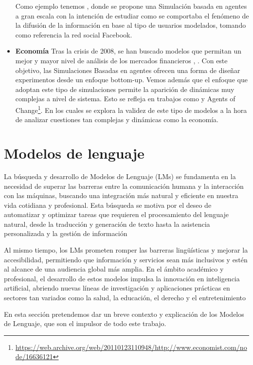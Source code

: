 \begin{itemize}
Como ejemplo tenemos \cite{nasrinpour2016agent}, donde se propone una Simulación  basada en agentes a gran escala con la intención de estudiar como se comportaba el fenómeno de la difusión de la información en base al tipo de usuarios modelados, tomando como referencia la red social Facebook.
	\item \textbf{Economía} Tras la crisis de 2008, se han buscado modelos que permitan un mejor y mayor nivel de análisis de los mercados financieros \cite {bookstaber2017end}, \cite{farmer2009economy}. Con este objetivo, las Simulaciones Basadas en agentes ofrecen una forma de diseñar experimentos desde un enfoque bottom-up. Vemos además que el enfoque que adoptan este tipo de simulaciones permite la aparición de dinámicas muy complejas a nivel de sistema. Esto se refleja en trabajos como \cite{tesfatsion2006handbook} y Agents of Change\footnote{\url{https://web.archive.org/web/20110123110948/http://www.economist.com/node/16636121}}. En los cuales se explora la validez de este tipo de modelos a la hora de analizar cuestiones tan complejas y dinámicas como la economía.
\end{itemize}

\section{Modelos de lenguaje}

La búsqueda y desarrollo de Modelos de Lenguaje (LMs) se fundamenta en la necesidad de superar las barreras entre la comunicación humana y la interacción con las máquinas, buscando una integración más natural y eficiente en nuestra vida cotidiana y profesional.  Esta búsqueda se motiva por el deseo de automatizar y optimizar tareas que requieren el procesamiento del lenguaje natural, desde la traducción y generación de texto hasta la asistencia personalizada y la gestión de información

Al mismo tiempo, los LMs prometen romper las barreras lingüísticas y mejorar la accesibilidad, permitiendo que información y servicios sean más inclusivos y estén al alcance de una audiencia global más amplia. En el ámbito académico y profesional, el desarrollo de estos modelos impulsa la innovación en inteligencia artificial, abriendo nuevas líneas de investigación y aplicaciones prácticas en sectores tan variados como la salud, la educación, el derecho y el entretenimiento

En esta sección pretendemos dar un breve contexto y explicación de los Modelos de Lenguaje, que son el impulsor de todo este trabajo.

